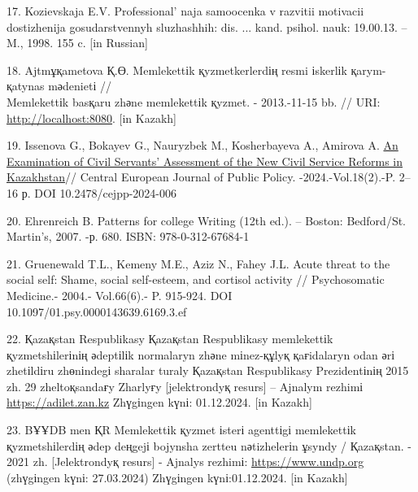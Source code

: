 \begin{references}
17. Kozievskaja E.V. Professional' naja samoocenka v
razvitii motivacii dostizhenija gosudarstvennyh sluzhashhih: dis. ...
kand. psihol. nauk: 19.00.13. -- M., 1998. 155 c. {[}in Russian{]}

18. Ajtmұқametova Қ.Ө. Memlekettіk қyzmetkerlerdің resmi іskerlіk
қarym-қatynas mәdenietі // \\Memlekettіk basқaru zhәne memlekettіk қyzmet.
- 2013.-11-15 bb. // URI:
\href{http://localhost:8080/xmlui/handle/123456789/1020}{http://localhost:8080}. {[}in Kazakh{]}

19. Issenova G., Bokayev G., Nauryzbek M., Kosherbayeva A., Amirova A.
\href{https://www.scopus.com/record/display.uri?eid=2-s2.0-85208677871&origin=resultslist&sort=plf-f&src=s&sot=b&sdt=b&s=TITLE\%28An+Examination+of+Civil+Servants\%E2\%80\%99+Assessment+of++the+New+Civil+Service+Reforms+in+Kazakhstan\%29&sessionSearchId=9294c12779ee47479a1a0997e8991897&relpos=0}{\hfill\break
An Examination of Civil Servants'{} Assessment of the New
Civil Service Reforms in Kazakhstan}// Central European Journal of
Public Policy. -2024.-Vol.18(2).-P. 2--16 р. DOI 10.2478/cejpp-2024-006

20. Ehrenreich B. Patterns for college Writing (12th ed.). -- Boston:
Bedford/St. Martin's, 2007. -р. 680. ISBN: 978-0-312-67684-1

21. Gruenewald T.L., Kemeny M.E., Aziz N., Fahey J.L. Acute threat to
the social self: Shame, social self-esteem, and cortisol activity //
Psychosomatic Medicine.- 2004.- Vol.66(6).- P. 915-924. DOI\\
10.1097/01.psy.0000143639.6169.3.ef

22. Қazaқstan Respublikasy Қazaқstan Respublikasy memlekettіk
қyzmetshіlerіnің әdeptіlіk normalaryn zhәne mіnez-құlyқ қaғidalaryn odan
әrі zhetіldіru zhөnіndegі sharalar turaly Қazaқstan Respublikasy
Prezidentіnің 2015 zh. 29 zheltoқsandaғy Zharlyғy {[}jelektrondyқ
resurs{]} -- Ajnalym rezhimі \\\href{https://adilet.zan.kz/kaz/docs/U1500000153}{https://adilet.zan.kz}
Zhүgіngen kүnі: 01.12.2024. {[}in Kazakh{]}

23. BҰҰDB men ҚR Memlekettіk қyzmet іsterі agenttіgі memlekettіk
қyzmetshіlerdің әdep deңgejі bojynsha zertteu nәtizhelerіn ұsyndy /
Қazaқstan. - 2021 zh. {[}Jelektrondyқ resurs{]} - Ajnalys rezhimі:
\href{https://www.undp.org/kk/kazakhstan/press-releases/buudb-men-kr-memlekettik-kyzmet-isteri-agenttigi-memlekettik-kyzmetshilerdin-dep-dengeyi-boyynsha-zertteu-ntizhelerin}{https://www.undp.org}
(zhүgіngen kүnі: 27.03.2024) Zhүgіngen kүnі:01.12.2024. {[}in Kazakh{]}
\end{references}

